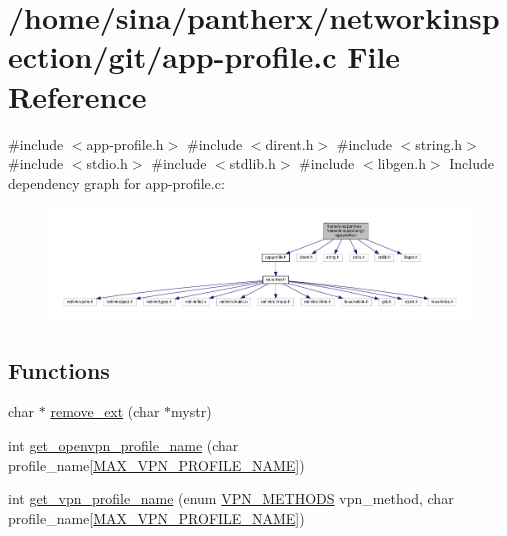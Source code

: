 \hypertarget{app-profile_8c}{}\section{/home/sina/pantherx/networkinspection/git/app-\/profile.c File Reference}
\label{app-profile_8c}
{\ttfamily \#include $<$app-\/profile.\+h$>$}\newline
{\ttfamily \#include $<$dirent.\+h$>$}\newline
{\ttfamily \#include $<$string.\+h$>$}\newline
{\ttfamily \#include $<$stdio.\+h$>$}\newline
{\ttfamily \#include $<$stdlib.\+h$>$}\newline
{\ttfamily \#include $<$libgen.\+h$>$}\newline
Include dependency graph for app-\/profile.c\+:\nopagebreak
\begin{figure}[H]
\begin{center}
\leavevmode
\includegraphics[width=350pt]{app-profile_8c__incl}
\end{center}
\end{figure}
\subsection*{Functions}
\begin{DoxyCompactItemize}
\item 
char $\ast$ \hyperlink{app-profile_8c_a59c7e3da3c5b7ecf10df2a5ef34b6953}{remove\+\_\+ext} (char $\ast$mystr)
\item 
int \hyperlink{app-profile_8c_a7ab4018359451259c67e57c83f9b7062}{get\+\_\+openvpn\+\_\+profile\+\_\+name} (char profile\+\_\+name\mbox{[}\hyperlink{route-tree_8h_ab6867a2365732ebd41ddf7459525d032}{M\+A\+X\+\_\+\+V\+P\+N\+\_\+\+P\+R\+O\+F\+I\+L\+E\+\_\+\+N\+A\+ME}\mbox{]})
\item 
int \hyperlink{app-profile_8c_aa32bea11cb1c8f99a45bc62cc8f5e455}{get\+\_\+vpn\+\_\+profile\+\_\+name} (enum \hyperlink{route-tree_8h_a5b876670828c4e38106ba1c6d91024b7}{V\+P\+N\+\_\+\+M\+E\+T\+H\+O\+DS} vpn\+\_\+method, char profile\+\_\+name\mbox{[}\hyperlink{route-tree_8h_ab6867a2365732ebd41ddf7459525d032}{M\+A\+X\+\_\+\+V\+P\+N\+\_\+\+P\+R\+O\+F\+I\+L\+E\+\_\+\+N\+A\+ME}\mbox{]})
\end{DoxyCompactItemize}


